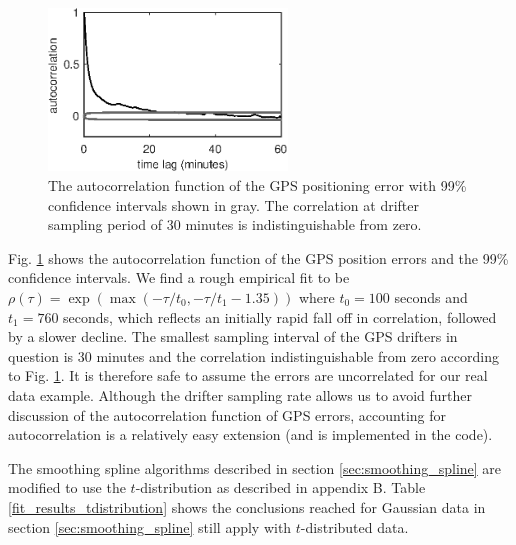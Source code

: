 \documentclass{ametsoc}
\begin{document}
\begin{figure}
  \centerline{\includegraphics[width=15pc,angle=0]{gps_autocorrelation.eps}}
  \caption{The autocorrelation function of the GPS positioning error with 99\% confidence intervals shown in gray. The correlation at drifter sampling period of 30 minutes is indistinguishable from zero.} 
  \label{gps_autocorrelation}
\end{figure}

Fig. \ref{gps_autocorrelation} shows the autocorrelation function of the GPS position errors and the 99\% confidence intervals. We find a rough empirical fit to be $\rho(\tau)=\exp\left(\max(-\tau/t_0,-\tau/t_1-1.35)\right)$ where $t_0=100$ seconds and $t_1=760$ seconds, which reflects an initially rapid fall off in correlation, followed by a slower decline. The smallest sampling interval of the GPS drifters in question is 30 minutes and the correlation indistinguishable from zero according to Fig. \ref{gps_autocorrelation}. It is therefore safe to assume the errors are uncorrelated for our real data example. Although the drifter sampling rate allows us to avoid further discussion of the autocorrelation function of GPS errors, accounting for autocorrelation is a relatively easy extension (and is implemented in the code).

The smoothing spline algorithms described in section \ref{sec:smoothing_spline} are modified to use the $t$-distribution as described in appendix B. Table \ref{fit_results_tdistribution} shows the conclusions reached for Gaussian data in section \ref{sec:smoothing_spline} still apply with $t$-distributed data.
\end{document}

